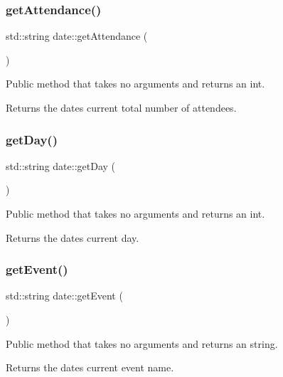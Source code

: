 \subsubsection{\texorpdfstring{get\+Attendance()}{getAttendance()}}
{\footnotesize\ttfamily std\+::string date\+::get\+Attendance (\begin{DoxyParamCaption}{ }\end{DoxyParamCaption})}

Public method that takes no arguments and returns an int. \begin{DoxyReturn}{Returns}
the date\textquotesingle{}s current total number of attendees. 
\end{DoxyReturn}
\mbox{\label{classdate_acb73db9ebcfe02f4a9ee9caa57ccf725}} 
\subsubsection{\texorpdfstring{get\+Day()}{getDay()}}
{\footnotesize\ttfamily std\+::string date\+::get\+Day (\begin{DoxyParamCaption}{ }\end{DoxyParamCaption})}

Public method that takes no arguments and returns an int. \begin{DoxyReturn}{Returns}
the date\textquotesingle{}s current day. 
\end{DoxyReturn}
\mbox{\label{classdate_ad1ba2d91051725eae822b1dc21f45ff5}} 
\subsubsection{\texorpdfstring{get\+Event()}{getEvent()}}
{\footnotesize\ttfamily std\+::string date\+::get\+Event (\begin{DoxyParamCaption}{ }\end{DoxyParamCaption})}

Public method that takes no arguments and returns an string. \begin{DoxyReturn}{Returns}
the date\textquotesingle{}s current event name. 
\end{DoxyReturn}
\mbox{\label{classdate_a0e08ae406a3f50eb28f854f90beb3a72}} 
